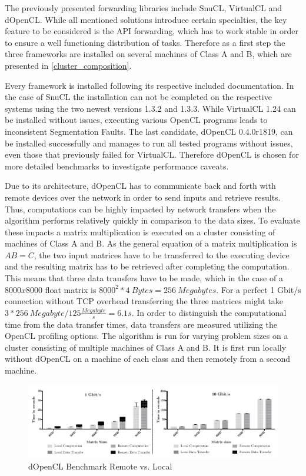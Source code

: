 The previously presented forwarding libraries include SnuCL, VirtualCL and dOpenCL. While all mentioned solutions introduce certain specialties, the key feature to be considered is the API forwarding, which has to work stable in order to ensure a well functioning distribution of tasks. Therefore as a first step the three frameworks are installed on several machines of Class A and B, which are presented in \ref{cluster_composition}.

Every framework is installed following its respective included documentation. In the case of SnuCL the installation can not be completed on the respective systems using the two newest versions 1.3.2 and 1.3.3. While VirtualCL 1.24 can be installed without issues, executing various OpenCL programs leads to inconsistent Segmentation Faults. The last candidate, dOpenCL 0.4.0r1819, can be installed successfully and manages to run all tested programs without issues, even those that previously failed for VirtualCL. Therefore dOpenCL is chosen for more detailed benchmarks to investigate performance caveats.

Due to its architecture, dOpenCL has to communicate back and forth with remote devices over the network in order to send inputs and retrieve results. Thus, computations can be highly impacted by network transfers when the algorithm performs relatively quickly in comparison to the data sizes. To evaluate these impacts a matrix multiplication is executed on a cluster consisting of machines of Class A and B. As the general equation of a matrix multiplication is $AB = C$, the two input matrices have to be transferred to the executing device and the resulting matrix has to be retrieved after completing the computation. This means that three data transfers have to be made, which in the case of a $8000x8000$ float matrix is $8000^2 * 4\ Bytes = 256\ Megabytes$. For a perfect 1 Gbit/s connection without TCP overhead transferring the three matrices might take $3*256\ Megabyte / 125\frac{Megabyte}{s} = 6.1s$. In order to distinguish the computational time from the data transfer times, data transfers are measured utilizing the OpenCL profiling options. The algorithm is run for varying problem sizes on a cluster consisting of multiple machines of Class A and B. It is first run locally without dOpenCL on a machine of each class and then remotely from a second machine.

\begin{figure}[H]

\includegraphics[width=1.0\textwidth]{images/data_transfer.pdf}
\centering
\caption{dOpenCL Benchmark Remote vs. Local}
\label{img:data_transfer}
\end{figure}

